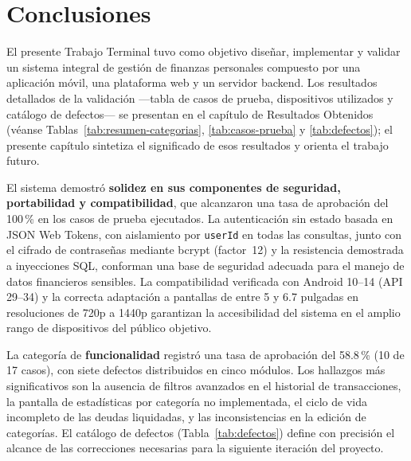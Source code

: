 \chapter{Conclusiones}

El presente Trabajo Terminal tuvo como objetivo diseñar, implementar y validar un sistema integral de gestión de finanzas personales compuesto por una aplicación móvil, una plataforma web y un servidor backend. Los resultados detallados de la validación ---tabla de casos de prueba, dispositivos utilizados y catálogo de defectos--- se presentan en el capítulo de Resultados Obtenidos (véanse Tablas~\ref{tab:resumen-categorias}, \ref{tab:casos-prueba} y \ref{tab:defectos}); el presente capítulo sintetiza el significado de esos resultados y orienta el trabajo futuro.

\bigskip

El sistema demostró \textbf{solidez en sus componentes de seguridad, portabilidad y compatibilidad}, que alcanzaron una tasa de aprobación del 100\,\% en los casos de prueba ejecutados. La autenticación sin estado basada en JSON Web Tokens, con aislamiento por \texttt{userId} en todas las consultas, junto con el cifrado de contraseñas mediante bcrypt (factor~12) y la resistencia demostrada a inyecciones SQL, conforman una base de seguridad adecuada para el manejo de datos financieros sensibles. La compatibilidad verificada con Android 10--14 (API 29--34) y la correcta adaptación a pantallas de entre 5 y 6.7 pulgadas en resoluciones de 720p a 1440p garantizan la accesibilidad del sistema en el amplio rango de dispositivos del público objetivo.

\bigskip

La categoría de \textbf{funcionalidad} registró una tasa de aprobación del 58.8\,\% (10 de 17 casos), con siete defectos distribuidos en cinco módulos. Los hallazgos más significativos son la ausencia de filtros avanzados en el historial de transacciones, la pantalla de estadísticas por categoría no implementada, el ciclo de vida incompleto de las deudas liquidadas, y las inconsistencias en la edición de categorías. El catálogo de defectos (Tabla~\ref{tab:defectos}) define con precisión el alcance de las correcciones necesarias para la siguiente iteración del proyecto.

\bigskip

